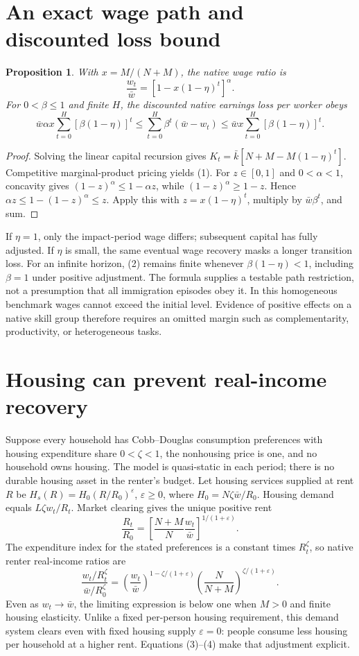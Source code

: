\documentclass[11pt,a4paper]{article}
\newtheorem{proposition}[theorem]{Proposition}
\begin{document}
\section{An exact wage path and discounted loss bound}
\begin{proposition}
With $x=M/(N+M)$, the native wage ratio is
\[
 \frac{w_t}{\bar w}=\left[1-x(1-\eta)^t\right]^\alpha. \tag{1}
\]
For $0<\beta\le1$ and finite $H$, the discounted native earnings loss per worker obeys
\[
 \bar w\alpha x\sum_{t=0}^H[\beta(1-\eta)]^t
 \le \sum_{t=0}^H\beta^t(\bar w-w_t)
 \le \bar w x\sum_{t=0}^H[\beta(1-\eta)]^t. \tag{2}
\]
\end{proposition}
\begin{proof}
Solving the linear capital recursion gives
$K_t=\bar k[N+M-M(1-\eta)^t]$. Competitive marginal-product pricing yields (1). For $z\in[0,1]$ and $0<\alpha<1$, concavity gives $(1-z)^\alpha\le1-\alpha z$, while $(1-z)^\alpha\ge1-z$. Hence $\alpha z\le1-(1-z)^\alpha\le z$. Apply this with $z=x(1-\eta)^t$, multiply by $\bar w\beta^t$, and sum.
\end{proof}
If $\eta=1$, only the impact-period wage differs; subsequent capital has fully adjusted. If $\eta$ is small, the same eventual wage recovery masks a longer transition loss. For an infinite horizon, (2) remains finite whenever $\beta(1-\eta)<1$, including $\beta=1$ under positive adjustment. The formula supplies a testable path restriction, not a presumption that all immigration episodes obey it. In this homogeneous benchmark wages cannot exceed the initial level. Evidence of positive effects on a native skill group therefore requires an omitted margin such as complementarity, productivity, or heterogeneous tasks.

\section{Housing can prevent real-income recovery}
Suppose every household has Cobb--Douglas consumption preferences with housing expenditure share $0<\zeta<1$, the nonhousing price is one, and no household owns housing. The model is quasi-static in each period; there is no durable housing asset in the renter's budget. Let housing services supplied at rent $R$ be
$H_s(R)=H_0(R/R_0)^\varepsilon$, $\varepsilon\ge0$, where
$H_0=N\zeta\bar w/R_0$. Housing demand equals $L\zeta w_t/R_t$. Market clearing gives the unique positive rent
\[
 \frac{R_t}{R_0}=
 \left[\frac{N+M}{N}\frac{w_t}{\bar w}\right]^{1/(1+\varepsilon)}. \tag{3}
\]
The expenditure index for the stated preferences is a constant times $R_t^\zeta$, so native renter real-income ratios are
\[
 \frac{w_t/R_t^\zeta}{\bar w/R_0^\zeta}
 =\left(\frac{w_t}{\bar w}\right)^{1-\zeta/(1+\varepsilon)}
  \left(\frac N{N+M}\right)^{\zeta/(1+\varepsilon)}. \tag{4}
\]
Even as $w_t\to\bar w$, the limiting expression is below one when $M>0$ and finite housing elasticity. Unlike a fixed per-person housing requirement, this demand system clears even with fixed housing supply $\varepsilon=0$: people consume less housing per household at a higher rent. Equations (3)--(4) make that adjustment explicit.
\end{document}
